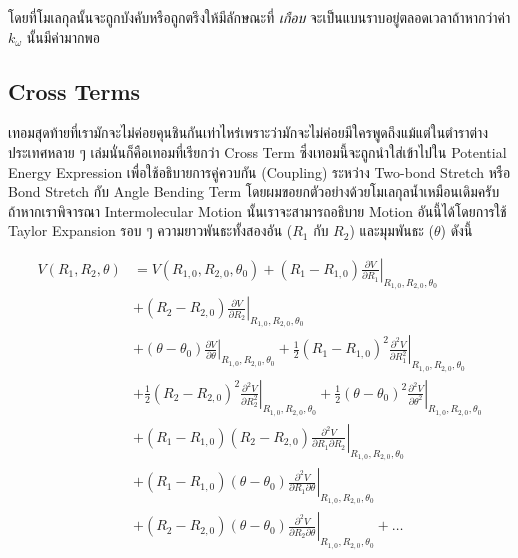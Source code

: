 \noindent โดยที่โมเลกุลนั้นจะถูกบังคับหรือถูกตรึงให้มีลักษณะที่ \textit{เกือบ} จะเป็นแบนราบอยู่ตลอดเวลาถ้าหากว่าค่า $k_{\omega}$ 
นั้นมีค่ามากพอ

\subsection{Cross Terms}

เทอมสุดท้ายที่เรามักจะไม่ค่อยคุนชินกันเท่าไหร่เพราะว่ามักจะไม่ค่อยมีใครพูดถึงแม้แต่ในตำราต่างประเทศหลาย ๆ เล่มนั่นก็คือเทอมที่เรียกว่า Cross Term 
ซึ่งเทอมนี้จะถูกนำใส่เข้าไปใน Potential Energy Expression เพื่อใช้อธิบายการคู่ควบกัน (Coupling) ระหว่าง Two-bond Stretch 
หรือ Bond Stretch กับ Angle Bending Term โดยผมขอยกตัวอย่างด้วยโมเลกุลน้ำเหมือนเดิมครับ ถ้าหากเราพิจารณา Intermolecular Motion 
นั้นเราจะสามารถอธิบาย Motion อันนี้ได้โดยการใช้ Taylor Expansion รอบ ๆ ความยาวพันธะทั้งสองอัน ($R_{1}$ กับ $R_{2}$) และมุมพันธะ 
($\theta$) ดังนี้ 
   
\begin{align}
    V\left(R_1, R_2, \theta\right) 
    &= 
    V\left(R_{1,0}, R_{2,0}, \theta_0\right) 
        + \left.\left(R_1-R_{1,0}\right) \frac{\partial V}{\partial R_1}\right|_{R_{1,0}, R_{2,0}, \theta_0} \nonumber \\
    &+ \left.\left(R_2-R_{2,0}\right) \frac{\partial V}{\partial R_2}\right|_{R_{1,0}, R_{2,0}, \theta_0} \nonumber \\
    &+ \left.\left(\theta-\theta_0\right) \frac{\partial V}{\partial \theta}\right|_{R_{1,0}, R_{2,0}, \theta_0} 
        + \left.\frac{1}{2}\left(R_1-R_{1,0}\right)^2 
            \frac{\partial^2 V}{\partial R_1^2}\right|_{R_{1,0}, R_{2,0}, \theta_0} \nonumber \\
    &+ \left.\frac{1}{2}\left(R_2-R_{2,0}\right)^2 
        \frac{\partial^2 V}{\partial R_2^2}\right|_{R_{1,0}, R_{2,0}, \theta_0} 
        + \left.\frac{1}{2}\left(\theta-\theta_0\right)^2 
            \frac{\partial^2 V}{\partial \theta^2}\right|_{R_{1,0}, R_{2,0}, \theta_0} \\
    &+ \left.\left(R_1-R_{1,0}\right)\left(R_2-R_{2,0}\right) 
        \frac{\partial^2 V}{\partial R_1 \partial R_2}\right|_{R_{1,0}, R_{2,0}, \theta_0} \nonumber \\
    &+ \left.\left(R_1-R_{1,0}\right)\left(\theta-\theta_0\right) 
        \frac{\partial^2 V}{\partial R_1 \partial \theta}\right|_{R_{1,0}, R_{2,0}, \theta_0} \nonumber \\
    &+ \left.\left(R_2-R_{2,0}\right)\left(\theta-\theta_0\right) 
        \frac{\partial^2 V}{\partial R_2 \partial \theta}\right|_{R_{1,0}, R_{2,0}, \theta_0} + \ldots
\end{align}

